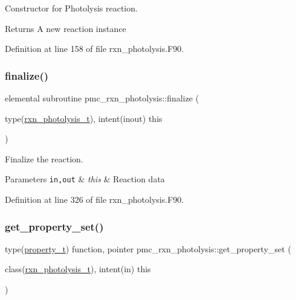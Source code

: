 Constructor for Photolysis reaction. 

\begin{DoxyReturn}{Returns}
A new reaction instance 
\end{DoxyReturn}


Definition at line 158 of file rxn\+\_\+photolysis.\+F90.

\mbox{\label{namespacepmc__rxn__photolysis_a187bdf76b3c0f39f73d8cbab0a813ac9}} 
\subsubsection{\texorpdfstring{finalize()}{finalize()}}
{\footnotesize\ttfamily elemental subroutine pmc\+\_\+rxn\+\_\+photolysis\+::finalize (\begin{DoxyParamCaption}\item[{type(\mbox{\hyperlink{structpmc__rxn__photolysis_1_1rxn__photolysis__t}{rxn\+\_\+photolysis\+\_\+t}}), intent(inout)}]{this }\end{DoxyParamCaption})\hspace{0.3cm}{\ttfamily [private]}}



Finalize the reaction. 


\begin{DoxyParams}[1]{Parameters}
\mbox{\tt in,out}  & {\em this} & Reaction data \\
\hline
\end{DoxyParams}


Definition at line 326 of file rxn\+\_\+photolysis.\+F90.

\mbox{\label{namespacepmc__rxn__photolysis_a924562930599077fc2c7ec9d2c470e84}} 
\subsubsection{\texorpdfstring{get\+\_\+property\+\_\+set()}{get\_property\_set()}}
{\footnotesize\ttfamily type(\mbox{\hyperlink{structpmc__property_1_1property__t}{property\+\_\+t}}) function, pointer pmc\+\_\+rxn\+\_\+photolysis\+::get\+\_\+property\+\_\+set (\begin{DoxyParamCaption}\item[{class(\mbox{\hyperlink{structpmc__rxn__photolysis_1_1rxn__photolysis__t}{rxn\+\_\+photolysis\+\_\+t}}), intent(in)}]{this }\end{DoxyParamCaption})\hspace{0.3cm}{\ttfamily [private]}}



